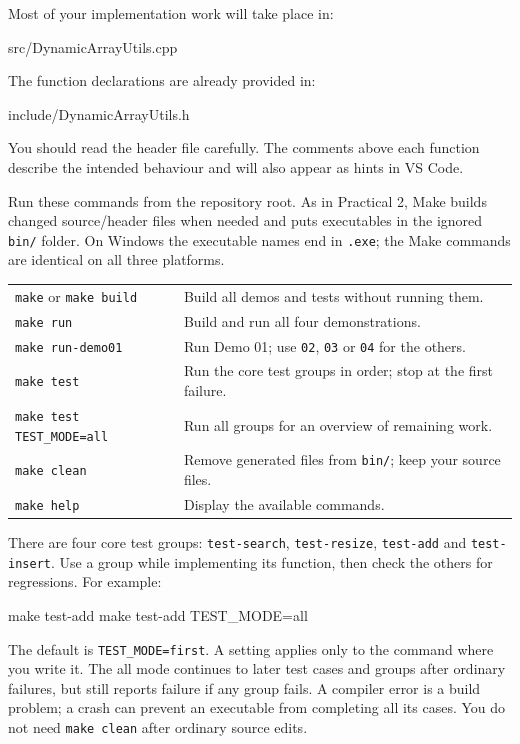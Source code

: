 \documentclass{csc2059practical}
\begin{document}
Most of your implementation work will take place in:

\begin{terminal}
src/DynamicArrayUtils.cpp
\end{terminal}

The function declarations are already provided in:

\begin{terminal}
include/DynamicArrayUtils.h
\end{terminal}

You should read the header file carefully. The comments above each function describe the intended behaviour and will also appear as hints in VS Code.


Run these commands from the repository root. As in Practical 2, Make builds changed source/header files when needed and puts executables in the ignored \texttt{bin/} folder. On Windows the executable names end in \texttt{.exe}; the Make commands are identical on all three platforms.

\begin{tabularx}{\linewidth}{@{}l X@{}}
\texttt{make} or \texttt{make build} & Build all demos and tests without running them.\\
\texttt{make run} & Build and run all four demonstrations.\\
\texttt{make run-demo01} & Run Demo 01; use \texttt{02}, \texttt{03} or \texttt{04} for the others.\\
\texttt{make test} & Run the core test groups in order; stop at the first failure.\\
\texttt{make test TEST\_MODE=all} & Run all groups for an overview of remaining work.\\
\texttt{make clean} & Remove generated files from \texttt{bin/}; keep your source files.\\
\texttt{make help} & Display the available commands.\\
\end{tabularx}

There are four core test groups: \texttt{test-search}, \texttt{test-resize}, \texttt{test-add} and \texttt{test-insert}. Use a group while implementing its function, then check the others for regressions. For example:
\begin{bashcode}
make test-add
make test-add TEST_MODE=all
\end{bashcode}
The default is \texttt{TEST\_MODE=first}. A setting applies only to the command where you write it. The all mode continues to later test cases and groups after ordinary failures, but still reports failure if any group fails. A compiler error is a build problem; a crash can prevent an executable from completing all its cases. You do not need \texttt{make clean} after ordinary source edits.
\end{document}
